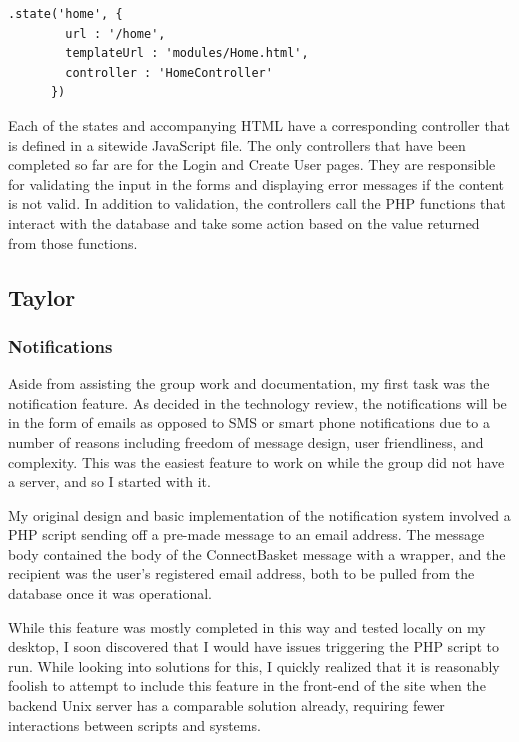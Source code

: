\documentclass[onecolumn, draftclsnofoot,10pt, compsoc]{IEEEtran}
\begin{document}
\begin{lstlisting}
.state('home', {
        url : '/home',
        templateUrl : 'modules/Home.html',
        controller : 'HomeController'
      })

\end{lstlisting}

Each of the states and accompanying HTML have a corresponding controller that is defined in a sitewide JavaScript file. The only controllers that have been completed so far are for the Login and Create User pages. They are responsible for validating the input in the forms and displaying error messages if the content is not valid. In addition to validation, the controllers call the PHP functions that interact with the database and take some action based on the value returned from those functions.


\subsection{Taylor}

\subsubsection{Notifications}
Aside from assisting the group work and documentation, my first task was the notification feature. As decided in the technology review, the notifications will be in the form of emails as opposed to SMS or smart phone notifications due to a number of reasons including freedom of message design, user friendliness, and complexity. This was the easiest feature to work on while the group did not have a server, and so I started with it. 

My original design and basic implementation of the notification system involved a PHP script sending off a pre-made message to an email address. The message body contained the body of the ConnectBasket message with a wrapper, and the recipient was the user's registered email address, both to be pulled from the database once it was operational. 

While this feature was mostly completed in this way and tested locally on my desktop, I soon discovered that I would have issues triggering the PHP script to run. While looking into solutions for this, I quickly realized that it is reasonably foolish to attempt to include this feature in the front-end of the site when the backend Unix server has a comparable solution already, requiring fewer interactions between scripts and systems. 
\end{document}
